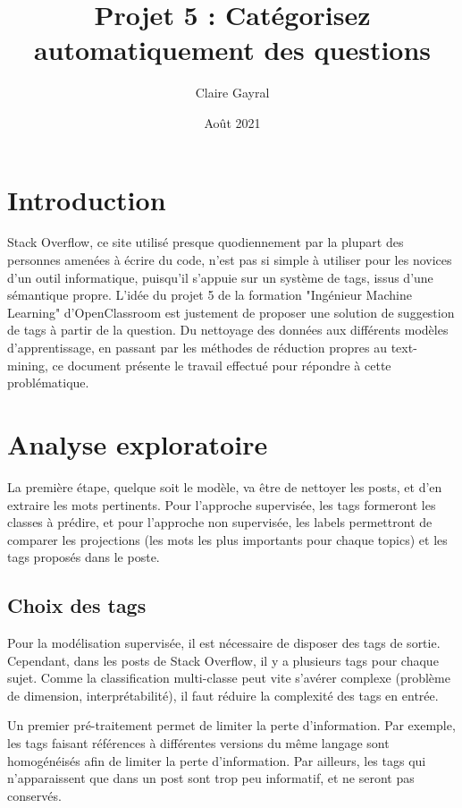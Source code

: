 \documentclass[a4paper,11pt]{article}
\title{Projet 5 : Catégorisez automatiquement des questions}
\author{Claire Gayral}
\date{Août 2021}
\begin{document}
\maketitle
\tableofcontents
\newpage
\section*{Introduction}
Stack Overflow, ce site utilisé presque quodiennement par la plupart des personnes amenées à écrire du code, n'est pas si simple à utiliser pour les novices d'un outil informatique, puisqu'il s'appuie sur un système de tags, issus d'une sémantique propre. L'idée du projet 5 de la formation "Ingénieur Machine Learning" d'OpenClassroom est justement de proposer une solution de suggestion de tags à partir de la question. Du nettoyage des données aux différents modèles d'apprentissage, en passant par les méthodes de réduction propres au text-mining, ce document présente le travail effectué pour répondre à cette problématique.

\section{Analyse exploratoire}
La première étape, quelque soit le modèle, va être de nettoyer les posts, et d'en extraire les mots pertinents. Pour l'approche supervisée, les tags formeront les classes à prédire, et pour l'approche non supervisée, les labels permettront de comparer les projections (les mots les plus importants pour chaque topics) et les tags proposés dans le poste. 


\subsection{Choix des tags}
Pour la modélisation supervisée, il est nécessaire de disposer des tags de sortie. Cependant, dans les posts de Stack Overflow, il y a plusieurs tags pour chaque sujet. Comme la classification multi-classe peut vite s'avérer complexe (problème de dimension, interprétabilité), il faut réduire la complexité des tags en entrée. 

Un premier pré-traitement permet de limiter la perte d'information. Par exemple, les tags faisant références à différentes versions du même langage sont homogénéisés afin de limiter la perte d'information. Par ailleurs, les tags qui n'apparaissent que dans un post sont trop peu informatif, et ne seront pas conservés. 
\end{document}
